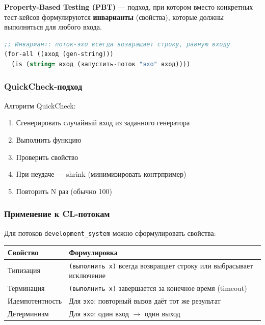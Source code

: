 \documentclass[10pt, oneside]{article}
\begin{document}
\textbf{Property-Based Testing (PBT)} --- подход, при котором вместо конкретных
тест-кейсов формулируются \textbf{инварианты} (свойства), которые должны
выполняться для любого входа.

\begin{lstlisting}[language=CommonLisp,caption={Пример property для потока эхо}]
;; Инвариант: поток-эхо всегда возвращает строку, равную входу
(for-all ((вход (gen-string)))
  (is (string= вход (запустить-поток "эхо" вход))))
\end{lstlisting}

\subsubsection{QuickCheck-подход}

Алгоритм QuickCheck:

\begin{enumerate}[leftmargin=1.5em]
  \item Сгенерировать случайный вход из заданного генератора
  \item Выполнить функцию
  \item Проверить свойство
  \item При неудаче --- shrink (минимизировать контрпример)
  \item Повторить N раз (обычно 100)
\end{enumerate}

\subsubsection{Применение к CL-потокам}

Для потоков \texttt{development\_system} можно сформулировать свойства:

\begin{center}
\begin{tabularx}{\textwidth}{lL}
  \toprule
  \textbf{Свойство} & \textbf{Формулировка} \\
  \midrule
  Типизация       & \texttt{(выполнить x)} всегда возвращает строку или выбрасывает исключение \\
  Терминация      & \texttt{(выполнить x)} завершается за конечное время (timeout) \\
  Идемпотентность & Для \texttt{эхо}: повторный вызов даёт тот же результат \\
  Детерминизм     & Для \texttt{эхо}: один вход $\to$ один выход \\
  \bottomrule
\end{tabularx}
\end{center}
\end{document}
